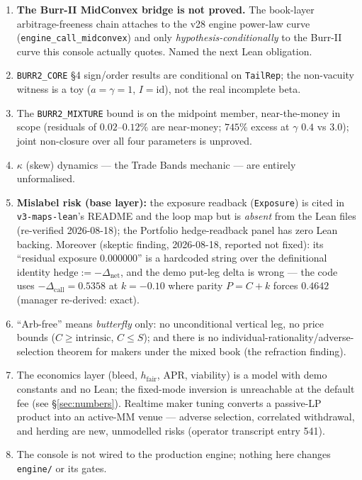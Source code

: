 \documentclass[11pt]{article}
\newcommand{\ib}{I}
\begin{document}
\begin{enumerate}\itemsep2pt
\item \textbf{The Burr-II MidConvex bridge is not proved.} The book-layer arbitrage-freeness
chain attaches to the v28 engine power-law curve (\texttt{engine\_call\_midconvex}) and only
\emph{hypothesis-conditionally} to the Burr-II curve this console actually quotes. Named the
next Lean obligation.
\item \texttt{BURR2\_CORE} \S4 sign/order results are conditional on \texttt{TailRep}; the
non-vacuity witness is a toy ($a=\gamma=1$, $\ib=\mathrm{id}$), not the real incomplete beta.
\item The \texttt{BURR2\_MIXTURE} bound is on the midpoint member, near-the-money in scope
(residuals of $0.02$--$0.12\%$ are near-money; $745\%$ excess at $\gamma$ $0.4$ vs $3.0$);
joint non-closure over all four parameters is unproved.
\item $\kappa$ (skew) dynamics --- the Trade Bands mechanic --- are entirely unformalised.
\item \textbf{Mislabel risk (base layer):} the exposure readback (\texttt{Exposure}) is cited
in \texttt{v3-maps-lean}'s README and the loop map but is \emph{absent} from the Lean files
(re-verified 2026-08-18); the Portfolio hedge-readback panel has zero Lean backing. Moreover
(skeptic finding, 2026-08-18, reported not fixed): its ``residual exposure 0.000000'' is a
hardcoded string over the definitional identity $\text{hedge}:=-\Delta_{\text{net}}$, and the
demo put-leg delta is wrong --- the code uses $-\Delta_{\text{call}} = 0.5358$ at $k=-0.10$
where parity $P = C + k$ forces $0.4642$ (manager re-derived: exact).
\item ``Arb-free'' means \emph{butterfly} only: no unconditional vertical leg, no price bounds
($C\ge\text{intrinsic}$, $C\le S$); and there is no individual-rationality/adverse-selection
theorem for makers under the mixed book (the refraction finding).
\item The economics layer (bleed, $h_{\text{fair}}$, APR, viability) is a model with demo
constants and no Lean; the fixed-mode inversion is unreachable at the default fee (see
\S\ref{sec:numbers}). Realtime maker tuning converts a passive-LP product into an active-MM
venue --- adverse selection, correlated withdrawal, and herding are new, unmodelled risks
(operator transcript entry 541).
\item The console is not wired to the production engine; nothing here changes
\texttt{engine/} or its gates.
\end{enumerate}
\end{document}
